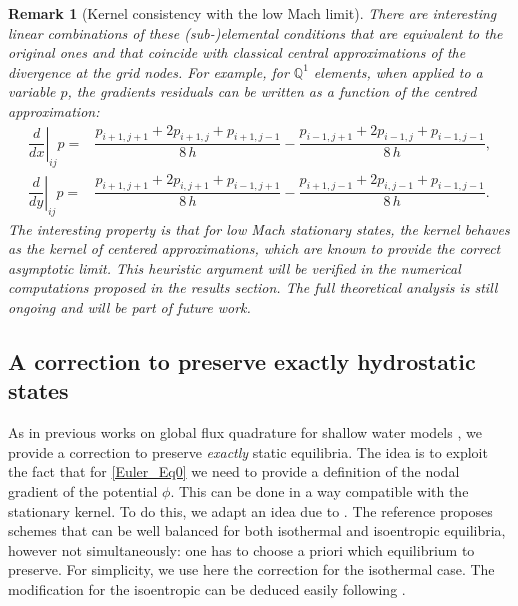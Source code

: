 \documentclass[a4paper,10pt]{article}
\newtheorem{remark}[theorem]{Remark}
\begin{document}
\begin{remark}[Kernel consistency with the low Mach limit]
	There are interesting linear combinations of these (sub-)elemental conditions that are equivalent to the original ones and that coincide with classical central approximations of the divergence at the grid nodes.
	For example, for $\mathbb Q^1$ elements, when applied to a variable $p$, the gradients residuals can be written as a function of the centred approximation:
	$$
	\begin{aligned}
		\left. \dfrac{d}{dx}\right\rvert_{ij}  p = & \dfrac{p_{i+1,j+1} + 2 p_{i+1,j} + p_{i+1,j-1} }{8\,h} - \dfrac{p_{i-1,j+1} + 2 p_{i-1,j} + p_{i-1,j-1} }{8\,h},\\
		\left. \dfrac{d}{dy}\right\rvert_{ij}  p = & \dfrac{p_{i+1,j+1} + 2 p_{i,j+1} + p_{i-1,j+1} }{8\,h} - \dfrac{p_{i+1,j-1} + 2 p_{i,j-1} + p_{i-1,j-1} }{8\,h}.
	\end{aligned}
	$$
	The interesting property is that for low Mach stationary states, the kernel behaves 
	as the kernel of centered approximations, which are known to provide the correct asymptotic limit. 
	This heuristic argument will be verified in the numerical computations proposed in the results section.
	The full theoretical analysis is still ongoing and will be part of future work.  
\end{remark}




 

\subsection{A correction to preserve exactly hydrostatic  states}\label{sec:hydro_equi}

As in previous works on global flux quadrature for shallow water models \cite{Ciallella2023,mantri2024fully,Micalizzi2024,Kazolea2025}, we provide a correction to preserve \emph{exactly} static equilibria.
The  idea is to exploit the fact that  for \eqref{Euler_Eq0} we need to provide a definition of the nodal   gradient of the  potential $\phi$. This can be done in a way compatible with the stationary kernel.
To do this, we adapt an idea due to  \cite{CZ17}. The reference proposes schemes that can be well balanced for both isothermal and  isoentropic equilibria, however not simultaneously:
one has to choose a priori which equilibrium to preserve. For simplicity, we use here the correction for the isothermal case. The modification for the isoentropic can be deduced easily following \cite{CZ17}.
\end{document}
